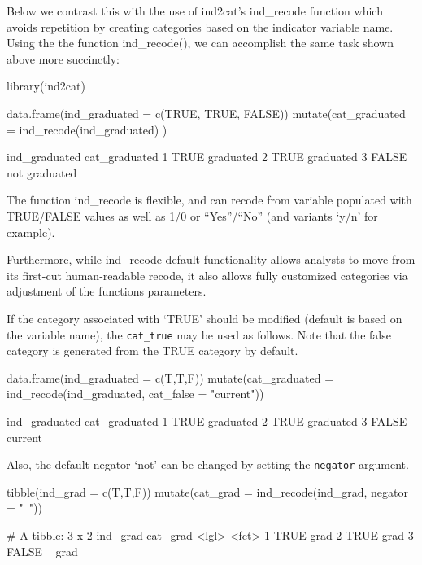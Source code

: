 Below we contrast this with the use of ind2cat's ind\_recode function
which avoids repetition by creating categories based on the indicator
variable name. Using the the function ind\_recode(), we can accomplish
the same task shown above more succinctly:

\begin{Schunk}
\begin{Sinput}
library(ind2cat)

data.frame(ind_graduated = 
             c(TRUE, TRUE, FALSE)) %
  mutate(cat_graduated  = 
           ind_recode(ind_graduated)
         )
\end{Sinput}
\begin{Soutput}
       ind_graduated cat_graduated
     1          TRUE     graduated
     2          TRUE     graduated
     3         FALSE not graduated
\end{Soutput}
\end{Schunk}

The function ind\_recode is flexible, and can recode from variable
populated with TRUE/FALSE values as well as 1/0 or ``Yes''/``No'' (and
variants `y/n' for example).

Furthermore, while ind\_recode default functionality allows analysts to
move from its first-cut human-readable recode, it also allows fully
customized categories via adjustment of the functions parameters.

If the category associated with `TRUE' should be modified (default is
based on the variable name), the \texttt{cat\_true} may be used as
follows. Note that the false category is generated from the TRUE
category by default.

\begin{Schunk}
\begin{Sinput}
data.frame(ind_graduated = c(T,T,F)) %
  mutate(cat_graduated  = ind_recode(ind_graduated, 
                                     cat_false = "current"))
\end{Sinput}
\begin{Soutput}
       ind_graduated cat_graduated
     1          TRUE     graduated
     2          TRUE     graduated
     3         FALSE       current
\end{Soutput}
\end{Schunk}

Also, the default negator `not' can be changed by setting the
\texttt{negator} argument.

\begin{Schunk}
\begin{Sinput}
tibble(ind_grad = c(T,T,F)) %
  mutate(cat_grad  = ind_recode(ind_grad, negator = "~"))
\end{Sinput}
\begin{Soutput}
     # A tibble: 3 x 2
       ind_grad cat_grad
       <lgl>    <fct>   
     1 TRUE     grad    
     2 TRUE     grad    
     3 FALSE    ~ grad
\end{Soutput}
\end{Schunk}

